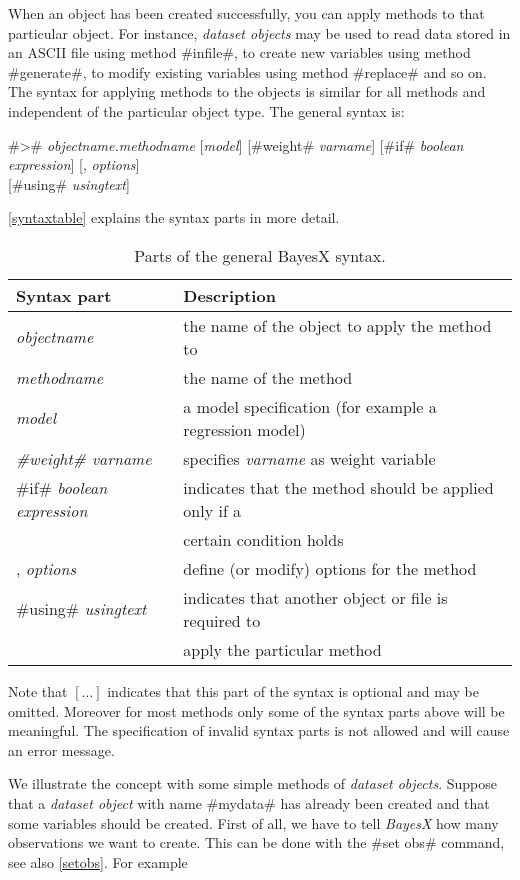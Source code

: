 When an object has been created successfully, you can apply methods
to that particular object. For instance, {\em dataset objects} may
be used to read data stored in an ASCII file using method #infile#,
to create new variables using method #generate#, to modify existing
variables using method #replace# and so on. The syntax for applying
methods to the objects is similar for all methods and independent of
the particular object type. The general syntax is:  

#># {\em objectname.methodname} [{\em model}] [#weight# {\em varname}] [#if# {\em boolean expression}] [, {\em options}] \\
\hspace*{4.8cm} [#using# {\em usingtext}]

\autoref{syntaxtable} explains the syntax parts in more detail.


\begin{table}[ht]
 \centering
\begin{tabular}{|l|l|}
\hline
Syntax part & Description \\
\hline
{\em objectname} & the name of the object to apply the method to \\
{\em methodname} & the name of the method \\
{\em model} & a model specification (for example a regression model) \\
{\em #weight# varname} & specifies {\em varname} as weight variable \\
#if# {\em boolean expression} & indicates that the method should be applied only if a \\
& certain condition holds \\
, {\em options} & define (or modify) options for the method \\
#using# {\em usingtext} & indicates that another object or file is required to \\
& apply the particular method \\
\hline
\end{tabular}
{\em \caption{\label{syntaxtable}Parts of the general BayesX
syntax.}}
\end{table}

Note that $[\dots]$ indicates that this part of the syntax is
optional and may be omitted. Moreover for most methods only some
of the syntax parts above will be meaningful. The specification of
invalid syntax parts is not allowed and will cause an error
message.

We illustrate the concept with some simple methods of {\em dataset
objects}. Suppose that a {\em dataset object} with name #mydata#
has already been created and that some variables should be
created. First of all, we have to tell {\em BayesX} how many
observations we want to create. This can be done with the
 #set obs# command, see also \autoref{setobs}. For example

